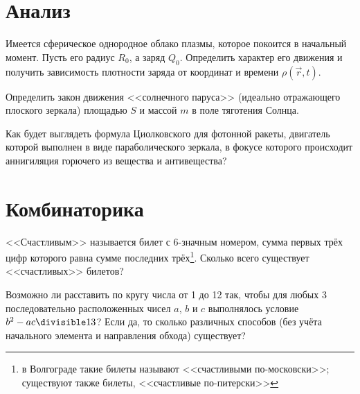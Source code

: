     \chapter{Анализ}
    \begin{problem}
        Имеется сферическое однородное облако плазмы, которое покоится в
        начальный момент. Пусть его радиус \( R_0 \), а заряд \( Q_0 \).
        Определить характер его движения и получить зависимость плотности заряда
        от координат и времени \( \rho(\vec{r}, t) \).
    \end{problem}
    \begin{problem}
        Определить закон движения <<солнечного паруса>> (идеально
        отражающего плоского зеркала) площадью \( S \) и массой \(m\) в поле
        тяготения Солнца.
    \end{problem}
    \begin{problem}
        Как будет выглядеть формула Циолковского для фотонной ракеты, двигатель
        которой выполнен в виде параболического зеркала, в фокусе которого
        происходит аннигиляция горючего из вещества и антивещества?
    \end{problem}
    \chapter{Комбинаторика}
    \begin{problem}
        <<Счастливым>> называется билет с 6-значным номером, сумма первых трёх
        цифр которого равна сумме последних трёх\footnote{в Волгограде такие
        билеты называют <<счастливыми по-московски>>; существуют также билеты,
        <<счастливые по-питерски>>}. Сколько всего существует
        <<счастливых>> билетов?
    \end{problem}
    \begin{problem}
        Возможно ли расставить по кругу числа от 1 до 12 так, чтобы для любых 3
        последовательно расположенных чисел \(a\), \(b\) и \(c\) выполнялось
        условие \( b^2 - ac \divisible 13 \)? Если да, то сколько различных
        способов (без учёта начального элемента и направления обхода) существует?
\end{problem}

